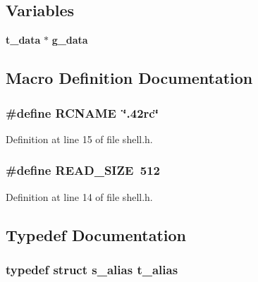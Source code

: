 \subsection*{Variables}
\begin{DoxyCompactItemize}
\item 
{\bf t\-\_\-data} $\ast$ {\bf g\-\_\-data}
\end{DoxyCompactItemize}


\subsection{Macro Definition Documentation}
\subsubsection[{R\-C\-N\-A\-M\-E}]{\setlength{\rightskip}{0pt plus 5cm}\#define R\-C\-N\-A\-M\-E~\char`\"{}.\-42rc\char`\"{}}\label{shell_8h_a7d28911d2cf3becfbdc3bb2271375405}


Definition at line 15 of file shell.\-h.

\subsubsection[{R\-E\-A\-D\-\_\-\-S\-I\-Z\-E}]{\setlength{\rightskip}{0pt plus 5cm}\#define R\-E\-A\-D\-\_\-\-S\-I\-Z\-E~512}\label{shell_8h_a86e1969b50e55e5d506233078ca0fa4c}


Definition at line 14 of file shell.\-h.



\subsection{Typedef Documentation}
\subsubsection[{t\-\_\-alias}]{\setlength{\rightskip}{0pt plus 5cm}typedef struct {\bf s\-\_\-alias}			 {\bf t\-\_\-alias}}\label{shell_8h_a45e9b5e9787a31371e46210ff3730e68}
